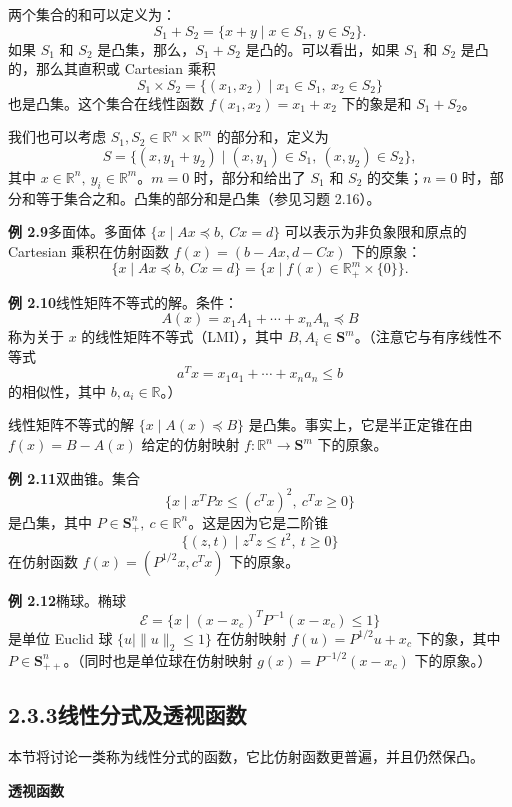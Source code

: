 \documentclass[UTF8, 12pt, fontset=fandol, oneside]{ctexart}
\begin{document}
两个集合的和可以定义为：
\[
  S_1+S_2=\{x+y\mid x\in S_1,\ y\in S_2\}.
\]
如果 $S_1$ 和 $S_2$ 是凸集，那么，$S_1+S_2$ 是凸的。可以看出，如果 $S_1$ 和 $S_2$ 是凸的，那么其直积或 Cartesian 乘积
\[
  S_1\times S_2=\{(x_1,x_2)\mid x_1\in S_1,\ x_2\in S_2\}
\]
也是凸集。这个集合在线性函数 $f(x_1,x_2)=x_1+x_2$ 下的象是和 $S_1+S_2$。

我们也可以考虑 $S_1,S_2\in\mathbb{R}^n\times\mathbb{R}^m$ 的部分和，定义为
\[
  S=\{(x,y_1+y_2)\mid (x,y_1)\in S_1,\ (x,y_2)\in S_2\},
\]
其中 $x\in\mathbb{R}^n,\ y_i\in\mathbb{R}^m$。$m=0$ 时，部分和给出了 $S_1$ 和 $S_2$ 的交集；$n=0$ 时，部分和等于集合之和。凸集的部分和是凸集（参见习题 2.16）。

\noindent\textbf{例 2.9}\quad 多面体。多面体 $\{x\mid Ax\preceq b,\ Cx=d\}$ 可以表示为非负象限和原点的 Cartesian 乘积在仿射函数 $f(x)=(b-Ax,d-Cx)$ 下的原象：
\[
  \{x\mid Ax\preceq b,\ Cx=d\}
  =\{x\mid f(x)\in\mathbb{R}_+^m\times\{0\}\}.
\]

\noindent\textbf{例 2.10}\quad 线性矩阵不等式的解。条件：
\begin{equation}
  A(x)=x_1A_1+\cdots+x_nA_n\preceq B
  \tag{2.11}
\end{equation}
称为关于 $x$ 的线性矩阵不等式（LMI），其中 $B,A_i\in\mathbf{S}^m$。（注意它与有序线性不等式
\[
  a^Tx=x_1a_1+\cdots+x_na_n\le b
\]
的相似性，其中 $b,a_i\in\mathbb{R}$。）

线性矩阵不等式的解 $\{x\mid A(x)\preceq B\}$ 是凸集。事实上，它是半正定锥在由 $f(x)=B-A(x)$ 给定的仿射映射 $f:\mathbb{R}^n\to\mathbf{S}^m$ 下的原象。

\noindent\textbf{例 2.11}\quad 双曲锥。集合
\[
  \{x\mid x^TPx\le (c^Tx)^2,\ c^Tx\ge 0\}
\]
是凸集，其中 $P\in\mathbf{S}_+^n,\ c\in\mathbb{R}^n$。这是因为它是二阶锥
\[
  \{(z,t)\mid z^Tz\le t^2,\ t\ge 0\}
\]
在仿射函数 $f(x)=(P^{1/2}x,c^Tx)$ 下的原象。

\noindent\textbf{例 2.12}\quad 椭球。椭球
\[
  \mathcal{E}=\{x\mid (x-x_c)^TP^{-1}(x-x_c)\le 1\}
\]
是单位 Euclid 球 $\{u\mid \|u\|_2\le 1\}$ 在仿射映射 $f(u)=P^{1/2}u+x_c$ 下的象，其中 $P\in\mathbf{S}_{++}^n$。（同时也是单位球在仿射映射 $g(x)=P^{-1/2}(x-x_c)$ 下的原象。）

\subsection*{2.3.3\quad 线性分式及透视函数}

本节将讨论一类称为线性分式的函数，它比仿射函数更普遍，并且仍然保凸。

\noindent\textbf{透视函数}
\end{document}
